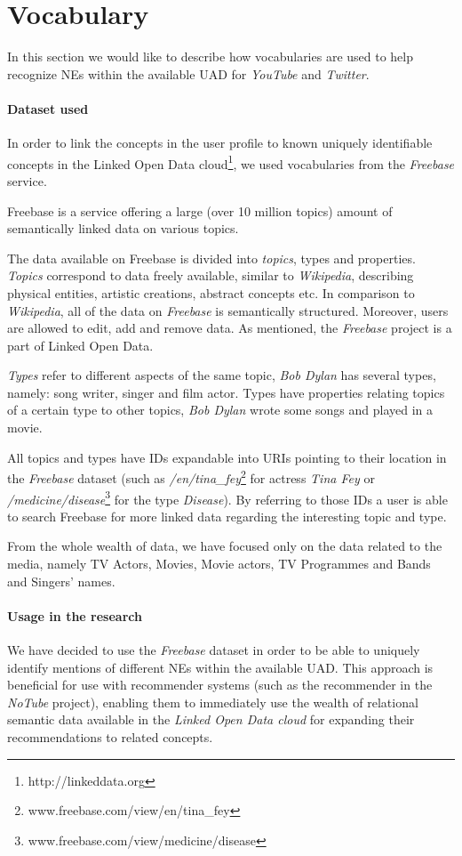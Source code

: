 \section{Vocabulary}
\label{sec:vocabulary}
In this section we would like to describe how vocabularies are used to help recognize NEs within
the available UAD for \textit{YouTube} and \textit{Twitter}.

\paragraph{Dataset used}
In order to link the concepts in the user profile to known uniquely identifiable concepts in the Linked Open Data
cloud\footnote{http://linkeddata.org}, we used vocabularies from the \textit{Freebase} service.

Freebase is a service offering a large (over 10 million topics) amount of semantically linked data on various topics.

The data available on Freebase is divided into \textit{topics}, types and properties. \textit{Topics} correspond to data
freely available, similar to \textit{Wikipedia}, describing physical entities, artistic creations, abstract concepts
etc. In comparison to \textit{Wikipedia}, all of the data on \textit{Freebase} is semantically structured. Moreover,
users are allowed to edit, add and remove data. As mentioned, the \textit{Freebase} project is a part of Linked Open Data.

\textit{Types} refer to different aspects of the same topic, \eg \textit{Bob Dylan} has several types, namely:
song writer, singer and film actor. Types have properties relating topics of a certain type to other topics, \eg
\textit{Bob Dylan} wrote some songs and played in a movie.

All topics and types have IDs expandable into URIs pointing to their location in the \textit{Freebase} dataset
(such as \textit{/en/tina\_fey}\footnote{www.freebase.com/view/en/tina\_fey} for actress \textit{Tina Fey}
or \textit{/medicine/disease}\footnote{www.freebase.com/view/medicine/disease} for the type \textit{Disease}).
By referring to those IDs a user is able to search Freebase for more linked data regarding the interesting topic and type.

From the whole wealth of data, we have focused only on the data related to the media, namely TV Actors, Movies, Movie
actors, TV Programmes and Bands and Singers' names.

\paragraph{Usage in the research}
We have decided to use the \textit{Freebase} dataset in order to be able to uniquely identify mentions of different NEs
within the available UAD. This approach is beneficial for use with recommender systems (such as the recommender
in the \textit{NoTube} project), enabling them to immediately use the wealth of relational semantic data available
in the \textit{Linked Open Data cloud} for expanding their recommendations to related concepts.
